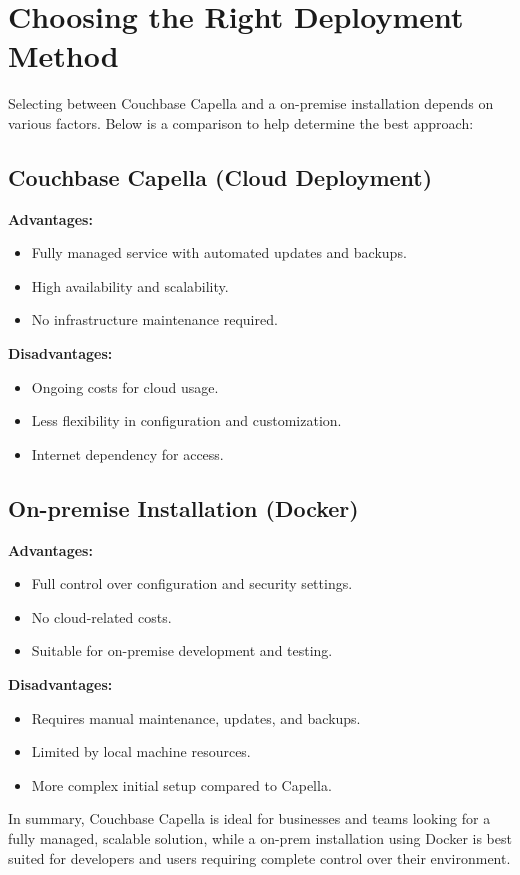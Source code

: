 \section{Choosing the Right Deployment Method}
Selecting between Couchbase Capella and a on-premise installation depends on various factors. Below is a comparison to help determine the best approach:

\subsection{Couchbase Capella (Cloud Deployment)}
\textbf{Advantages:}
\begin{itemize}
  \item Fully managed service with automated updates and backups.
  \item High availability and scalability.
  \item No infrastructure maintenance required.
\end{itemize}

\textbf{Disadvantages:}
\begin{itemize}
  \item Ongoing costs for cloud usage.
  \item Less flexibility in configuration and customization.
  \item Internet dependency for access.
\end{itemize}

\subsection{On-premise Installation (Docker)}
\textbf{Advantages:}
\begin{itemize}
  \item Full control over configuration and security settings.
  \item No cloud-related costs.
  \item Suitable for on-premise development and testing.
\end{itemize}

\textbf{Disadvantages:}
\begin{itemize}
  \item Requires manual maintenance, updates, and backups.
  \item Limited by local machine resources.
  \item More complex initial setup compared to Capella.
\end{itemize}

In summary, Couchbase Capella is ideal for businesses and teams looking for a fully managed, scalable solution, while a on-prem installation using Docker is best suited for developers and users requiring complete control over their environment.





